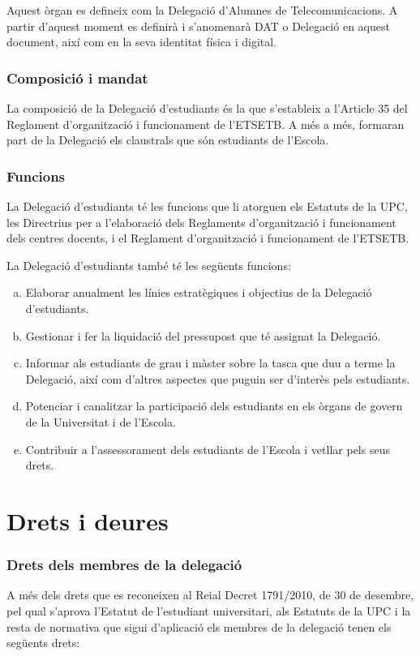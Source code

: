 \documentclass[a4paper,12pt]{article}
\begin{document}
Aquest òrgan es defineix com la Delegació d'Alumnes de Telecomunicacions. A partir d'aquest moment es definirà i s'anomenarà DAT o Delegació en aquest document, així com en la seva identitat física i digital.

\subsubsection{Composició i mandat}
La composició de la Delegació d'estudiants és la que s'estableix a l'Article 35 del Reglament d'organització i funcionament de l'ETSETB. A més a més, formaran part de la Delegació els claustrals que són estudiants de l'Escola.

\subsubsection{Funcions}\label{art:funcions}
La Delegació d'estudiants té les funcions que li atorguen els Estatuts de la UPC, les Directrius per a l'elaboració dels Reglaments d'organització i funcionament dels centres docents, i el Reglament d'organització i funcionament de l'ETSETB.

La Delegació d'estudiants també té les següents funcions:
\begin{enumerate}[a)]
	\item Elaborar anualment les línies estratègiques i objectius de la Delegació d'estudiants.
	\item Gestionar i fer la liquidació del pressupost que té assignat la Delegació.
	\item Informar als estudiants de grau i màster sobre la tasca que duu a terme la Delegació, així com d'altres aspectes que puguin ser d'interès pels estudiants.
	\item Potenciar i canalitzar la participació dels estudiants en els òrgans de govern de la Universitat i de l'Escola.
	\item Contribuir a l'assessorament dels estudiants de l'Escola i vetllar pels seus drets.
\end{enumerate}

\section{Drets i deures}
\subsubsection{Drets dels membres de la delegació}
A més dels drets que es reconeixen al Reial Decret 1791/2010, de 30 de desembre, pel qual s'aprova l'Estatut de l'estudiant universitari, als Estatuts de la UPC i la resta de normativa que sigui d'aplicació els membres de la delegació tenen els següents drets:
\end{document}
